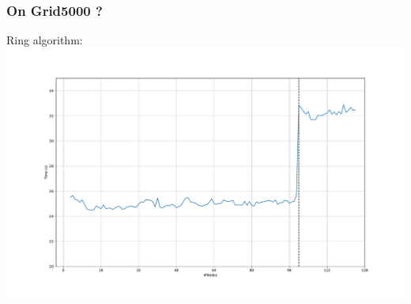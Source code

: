 \documentclass[xcolor={rgb,x11names,svgnames},rgb,x11names,svgnames]{beamer}
\begin{document}
\begin{frame}
  \frametitle{On Grid5000 ?}

  Ring algorithm:
  \includegraphics[width=\textwidth]{gros_cyclic.pdf}
\end{frame}

\end{document}
